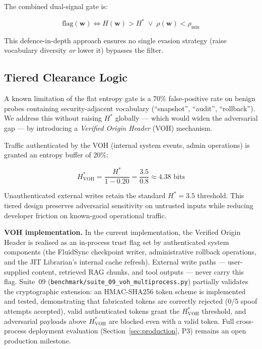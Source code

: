 \documentclass[11pt,twocolumn]{article}
\begin{document}
The combined dual-signal gate is:

\begin{equation}
  \text{flag}(\mathbf{w}) \iff H(\mathbf{w}) > H^{*}
    \;\vee\; \rho(\mathbf{w}) < \rho_{\min}
  \label{eq:dualgate}
\end{equation}

This defence-in-depth approach ensures no single evasion strategy
(raise vocabulary diversity \emph{or} lower it) bypasses the filter.

\subsection{Tiered Clearance Logic}

A known limitation of the flat entropy gate is a 70\% false-positive
rate on benign probes containing security-adjacent vocabulary
(``snapshot'', ``audit'', ``rollback''). We address this without
raising $H^{*}$ globally --- which would widen the adversarial gap ---
by introducing a \emph{Verified Origin Header} (VOH) mechanism.

Traffic authenticated by the VOH (internal system events, admin
operations) is granted an entropy buffer of 20\%:

\begin{equation}
  H^{*}_{\text{VOH}} = \frac{H^{*}}{1 - 0.20} = \frac{3.5}{0.8}
    \approx 4.38 \text{ bits}
  \label{eq:voh}
\end{equation}

Unauthenticated external writes retain the standard $H^{*} = 3.5$
threshold. This tiered design preserves adversarial sensitivity on
untrusted inputs while reducing developer friction on known-good
operational traffic.

\textbf{VOH implementation.}
In the current implementation, the Verified Origin Header is realised
as an in-process trust flag set by authenticated system components
(the FluidSync checkpoint writer, administrative rollback operations,
and the JIT Librarian's internal cache refresh). External write paths
--- user-supplied content, retrieved RAG chunks, and tool outputs ---
never carry this flag. Suite~09 (\texttt{benchmark/suite\_09\_voh\_multiprocess.py})
partially validates the cryptographic extension: an HMAC-SHA256 token
scheme is implemented and tested, demonstrating that fabricated tokens
are correctly rejected (0/5 spoof attempts accepted), valid authenticated
tokens grant the $H^{*}_\text{VOH}$ threshold, and adversarial payloads
above $H^{*}_\text{VOH}$ are blocked even with a valid token.
Full cross-process deployment evaluation (Section~\ref{sec:production}, P3)
remains an open production milestone.
\end{document}
